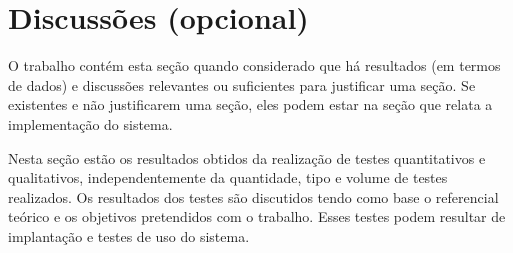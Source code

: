 \section{Discussões (opcional)}\label{sec:discussoes}

O trabalho contém esta seção quando considerado que há resultados (em termos de dados) e discussões relevantes ou suficientes para justificar uma seção. Se existentes e não justificarem uma seção, eles podem estar na seção que relata a implementação do sistema.

Nesta seção estão os resultados obtidos da realização de testes quantitativos e qualitativos, independentemente da quantidade, tipo e volume de testes realizados. Os resultados dos testes são discutidos tendo como base o referencial teórico e os objetivos pretendidos com o trabalho. Esses testes podem resultar de implantação e testes de uso do sistema.
